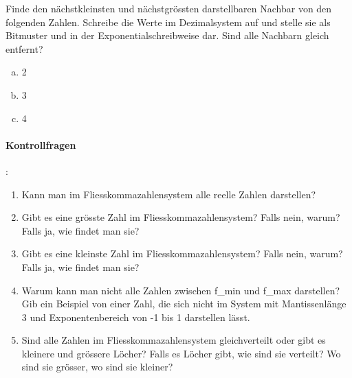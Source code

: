 \begin{aufgabe}
Finde den nächstkleinsten und nächstgrössten darstellbaren Nachbar von den folgenden Zahlen. Schreibe die Werte im Dezimalsystem auf und stelle sie als Bitmuster und in der Exponentialschreibweise dar. Sind alle Nachbarn gleich entfernt?
\begin{enumerate}[(a)]
\item 2
\item 3
\item 4
\end{enumerate}
\end{aufgabe}

\paragraph{Kontrollfragen}:
\begin{enumerate}
\item Kann man im Fliesskommazahlensystem alle reelle Zahlen darstellen?
\item Gibt es eine grösste Zahl im Fliesskommazahlensystem? Falls nein, warum? Falls ja, wie findet man sie?
\item Gibt es eine kleinste Zahl im Fliesskommazahlensystem? Falls nein, warum? Falls ja, wie findet man sie?
\item Warum kann man nicht alle Zahlen zwischen f\_min und f\_max darstellen? Gib ein Beispiel von einer Zahl, die sich nicht im System mit Mantissenlänge 3 und Exponentenbereich von -1 bis 1 darstellen lässt.
\item Sind alle Zahlen im Fliesskommazahlensystem gleichverteilt oder gibt es kleinere und grössere Löcher? Falls es Löcher gibt, wie sind sie verteilt? Wo sind sie grösser, wo sind sie kleiner?
\end{enumerate}